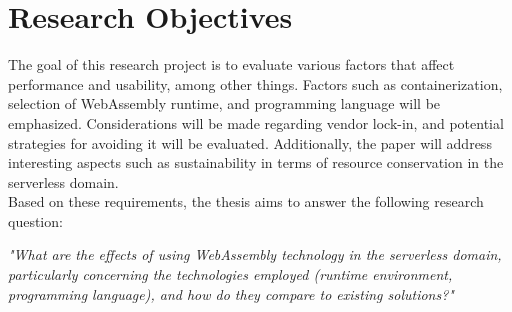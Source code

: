 \section{Research Objectives}
\label{sec:research-objectives}
The goal of this research project is to evaluate various factors that affect performance and usability, among other things. Factors such as containerization, selection of WebAssembly runtime, and programming language will be emphasized. Considerations will be made regarding vendor lock-in, and potential strategies for avoiding it will be evaluated. Additionally, the paper will address interesting aspects such as sustainability in terms of resource conservation in the serverless domain. \\
\newline
Based on these requirements, the thesis aims to answer the following research question:
\begin{center}
\textit{"What are the effects of using WebAssembly technology in the serverless domain, particularly concerning the technologies employed (runtime environment, programming language), and how do they compare to existing solutions?"}
\end{center}

